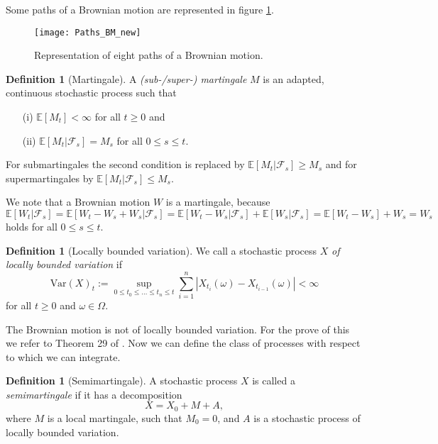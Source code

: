 \documentclass[11pt,titlepage]{article}
\newcommand{\E}{\mathbb{E}} %
\newcommand{\abs}[1]{{\left| #1 \right|}}
\theoremstyle{definition}
\newtheorem{definition}[theorem]{Definition}
\theoremstyle{remark}
\begin{document}
	Some paths of a Brownian motion are represented in figure \ref{Abb Pfade Brownsche Bewegung}.
	
	\begin{figure}[h!]
		\centering
		\texttt{[image: Paths\_BM\_new]}
		\caption{Representation of eight paths of a Brownian motion.}
		\label{Abb Pfade Brownsche Bewegung}
	\end{figure}
	
	\begin{definition}[Martingale]
		A \textsl{(sub-/super-) martingale} $M$ is an adapted, continuous stochastic process such that
		\begin{itemize}
			\item[(i)] $\E[M_t]<\infty$ for all $t\geq 0$ and
			\item[(ii)] $\E[M_t\vert\mathcal{F}_s] = M_s$ for all $0\leq s\leq t$.
		\end{itemize}
		For submartingales the second condition is replaced by $\E[M_t\vert \mathcal{F}_s]\geq M_s$ and for supermartingales by $\E[M_t\vert \mathcal{F}_s]\leq M_s$.
	\end{definition}
	
	We note that a Brownian motion $W$ is a martingale, because
	\[\E[W_t\vert\mathcal{F}_s] = \E[W_t - W_s +W_s \vert\mathcal{F}_s] = \E[W_t - W_s\vert\mathcal{F}_s] + \E[W_s\vert\mathcal{F}_s]= \E[W_t - W_s] + W_s = W_s\]
	holds for all $0\leq s\leq t$.

	\begin{definition}[Locally bounded variation]
		We call a stochastic process $X$ \textsl{of locally bounded variation} if
		\[\text{Var}(X)_t := \sup_{0\leq t_0\leq\ldots\leq t_n\leq t} \sum_{i=1}^n \abs{X_{t_i}(\omega)- X_{t_{i-1}}(\omega)}<\infty\]
		for all $t\geq 0$ and $\omega\in\Omega$.
	\end{definition}
	
	The Brownian motion is not of locally bounded variation. For the prove of this we refer to Theorem 29 of \cite{Protter2004}. Now we can define the class of processes with respect to which we can integrate.
	
	\begin{definition}[Semimartingale]
		A stochastic process $X$ is called a \textsl{semimartingale} if it has a decomposition
		\[X = X_0 + M + A,\]
		where $M$ is a local martingale, such that $M_0 = 0$, and $A$ is a stochastic process of locally bounded variation.
	\end{definition}
	
\end{document}
